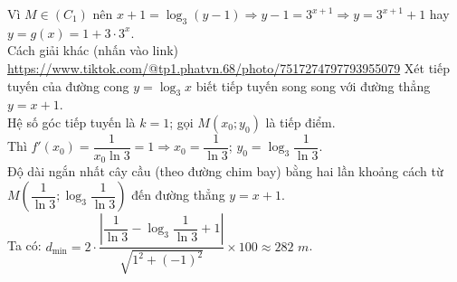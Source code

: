 \begin{ex}
{\begin{itemchoice}
			Vì $M \in (C_1)$ nên $x+1 = \log_3 (y-1) \Rightarrow y-1 = 3^{x+1} \Rightarrow y = 3^{x+1} + 1$ hay $y = g(x) = 1 + 3 \cdot 3^x$.\\
			Cách giải khác (nhấn vào link) \hyperlink{Cách giải khác(nhấn vào link)}{https://www.tiktok.com/@tp1.phatvn.68/photo/7517274797793955079}
			\itemch Xét tiếp tuyến của đường cong $y = \log_3 x$ biết tiếp tuyến song song với đường thẳng $y = x+1$.\\
			Hệ số góc tiếp tuyến là $k = 1$; gọi $M(x_0; y_0)$ là tiếp điểm.\\
			Thì $f'(x_0) = \dfrac{1}{x_0 \ln 3} = 1 \Rightarrow x_0 = \dfrac{1}{\ln 3}$; $y_0 = \log_3 \dfrac{1}{\ln 3}$.\\
			Độ dài ngắn nhất cây cầu (theo đường chim bay) bằng hai lần khoảng cách từ $M\left(\dfrac{1}{\ln 3}; \log_3 \dfrac{1}{\ln 3}\right)$ đến đường thẳng $y = x+1$.\\
			Ta có: $d_{\min} = 2 \cdot \dfrac{\left| \dfrac{1}{\ln 3} - \log_3 \dfrac{1}{\ln 3} + 1 \right|}{\sqrt{1^2 + (-1)^2}} \times 100 \approx 282$ $m$.
		\end{itemchoice}
	}
\end{ex}
